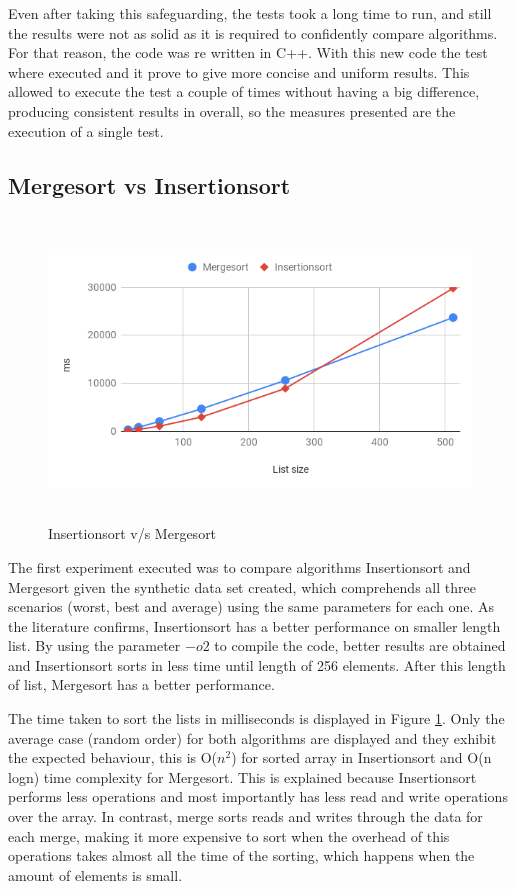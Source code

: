\documentclass[a4paper,12pt]{article}
\begin{document}
Even after taking this safeguarding, the tests took a long time to run, and still the results were not as solid as it is required to confidently compare algorithms. For that reason, the code was re written in C++. With this new code the test where  executed and it prove to give more concise and uniform results. This allowed to execute the test a couple of times without having a big difference, producing consistent results in overall, so the measures presented are the execution of a single test.

\subsection{Mergesort vs Insertionsort}

\begin{figure}[H]
    \centering
     \includegraphics[height=8cm,keepaspectratio]{./images/InsertionvsMerge.png}
    \caption{Insertionsort v/s Mergesort}
    \label{fig:InsrtVsMerge}
\end{figure}

The first experiment executed was to compare algorithms Insertionsort and Mergesort given the synthetic data set created, which comprehends all three scenarios (worst, best and average) using the same parameters for each one. As the literature confirms, Insertionsort has a better performance on smaller length list. By using the parameter $-o2$ to compile the code, better results are obtained and Insertionsort sorts in less time until length of 256 elements. After this length of list, Mergesort has a better performance.

The time taken to sort the lists in milliseconds is displayed in Figure \ref{fig:InsrtVsMerge}. Only the average case (random order) for both algorithms are displayed and they exhibit the expected behaviour, this is  O(${n}^2$) for sorted array in Insertionsort and O(n logn) time complexity for Mergesort. This is explained because Insertionsort performs less operations and most importantly has less read and write operations over the array. In contrast, merge sorts reads and writes through the data for each merge, making it more expensive to sort when the overhead of this operations takes almost all the time of the sorting, which happens when the amount of elements is small.
\end{document}
